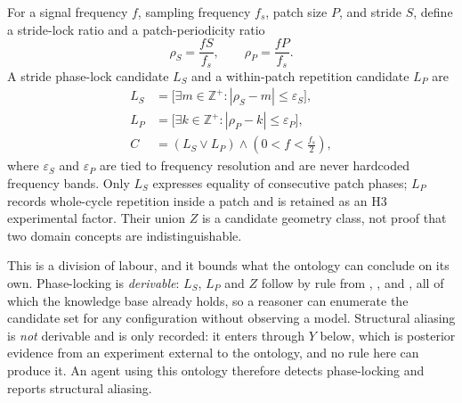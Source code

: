 For a signal frequency $f$, sampling frequency $f_s$, patch size $P$, and stride $S$, define a stride-lock ratio and a patch-periodicity ratio
\begin{equation}
\rho_S=\frac{fS}{f_s},
\qquad
\rho_P=\frac{fP}{f_s}.
\label{eq:locking-ratio}
\end{equation}
A stride phase-lock candidate $L_S$ and a within-patch repetition candidate $L_P$ are
\begin{equation}
\begin{aligned}
L_S&=\big[\exists m\in\mathbb{Z}^{+}:|\rho_S-m|\leq\varepsilon_S\big],\\
L_P&=\big[\exists k\in\mathbb{Z}^{+}:|\rho_P-k|\leq\varepsilon_P\big],\\
C&=(L_S\vee L_P)\wedge\left(0<f<\frac{f_s}{2}\right),
\end{aligned}
\label{eq:locking-candidate}
\end{equation}
where $\varepsilon_S$ and $\varepsilon_P$ are tied to frequency resolution and are never hardcoded frequency bands. Only $L_S$ expresses equality of consecutive patch phases; $L_P$ records whole-cycle repetition inside a patch and is retained as an H3 experimental factor. Their union $Z$ is a candidate geometry class, not proof that two domain concepts are indistinguishable.

This is a division of labour, and it bounds what the ontology can conclude on its own. Phase-locking is \emph{derivable}: $L_S$, $L_P$ and $Z$ follow by rule from , ,  and , all of which the knowledge base already holds, so a reasoner can enumerate the candidate set for any configuration without observing a model. Structural aliasing is \emph{not} derivable and is only recorded: it enters through $Y$ below, which is posterior evidence from an experiment external to the ontology, and no rule here can produce it. An agent using this ontology therefore detects phase-locking and reports structural aliasing.

